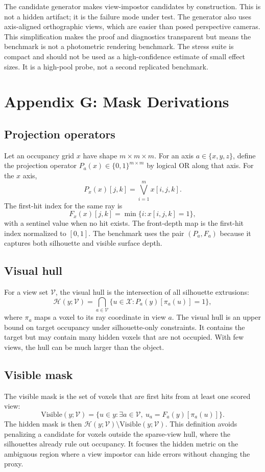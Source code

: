 \documentclass{article}
\newcommand{\vox}{\mathcal{X}}
\newcommand{\views}{\mathcal{V}}
\newcommand{\vhull}{\mathcal{H}}
\begin{document}
The candidate generator makes view-impostor candidates by construction. This is
not a hidden artifact; it is the failure mode under test. The generator also
uses axis-aligned orthographic views, which are easier than posed perspective
cameras. This simplification makes the proof and diagnostics transparent but
means the benchmark is not a photometric rendering benchmark. The stress suite
is compact and should not be used as a high-confidence estimate of small effect
sizes. It is a high-pool probe, not a second replicated benchmark.

\section{Appendix G: Mask Derivations}

\subsection{Projection operators}

Let an occupancy grid $x$ have shape $m\times m\times m$. For an axis
$a\in\{x,y,z\}$, define the projection operator
$P_a(x)\in\{0,1\}^{m\times m}$ by logical OR along that axis. For the $x$ axis,
\[
P_x(x)[j,k]=\bigvee_{i=1}^m x[i,j,k].
\]
The first-hit index for the same ray is
\[
F_x(x)[j,k]=\min\{i:x[i,j,k]=1\},
\]
with a sentinel value when no hit exists. The front-depth map is the first-hit
index normalized to $[0,1]$. The benchmark uses the pair
$(P_a,F_a)$ because it captures both silhouette and visible surface depth.

\subsection{Visual hull}

For a view set $\views$, the visual hull is the intersection of all silhouette
extrusions:
\[
\vhull(y;\views)=\bigcap_{a\in\views}\{u\in\vox:P_a(y)[\pi_a(u)]=1\},
\]
where $\pi_a$ maps a voxel to its ray coordinate in view $a$. The visual hull is
an upper bound on target occupancy under silhouette-only constraints. It
contains the target but may contain many hidden voxels that are not occupied.
With few views, the hull can be much larger than the object.

\subsection{Visible mask}

The visible mask is the set of voxels that are first hits from at least one
scored view:
\[
\mathrm{Visible}(y;\views)=
\{u\in y:\exists a\in\views,\ u_a=F_a(y)[\pi_a(u)]\}.
\]
The hidden mask is then $\vhull(y;\views)\setminus
\mathrm{Visible}(y;\views)$. This definition avoids penalizing a candidate for
voxels outside the sparse-view hull, where the silhouettes already rule out
occupancy. It focuses the hidden metric on the ambiguous region where a view
impostor can hide errors without changing the proxy.
\end{document}
